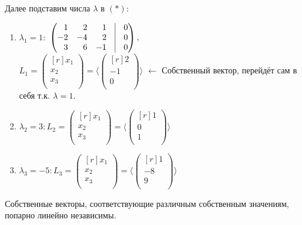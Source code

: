 Далее подставим числа $\lambda$ в $(*)$:

\begin{enumerate}
\item{
$\lambda_1=1 :$
$\begin{pmatrix*}[r]
 1 & 2 & 1 & \vrule & 0\\
 -2 & -4 & 2 & \vrule & 0\\
 3 & 6 & -1 & \vrule & 0\\
\end{pmatrix*} , $\\
$
L_1=
\left(
\begin{smallmatrix*}[r]
x_1\\ x_2\\ x_3\\ 
\end{smallmatrix*}
\right) 
=
\langle
\left(
\begin{smallmatrix*}[r]
2\\ -1\\ 0\\ 
\end{smallmatrix*}
\right) 
\rangle
$
$\leftarrow $
 Собственный вектор, перейдёт сам в себя т.к. $\lambda=1$.
}
\item{
$\lambda_2=3 :
L_2=
\left(
\begin{smallmatrix*}[r]
x_1\\ x_2\\ x_3\\ 
\end{smallmatrix*}
\right) 
=
\langle
\left(
\begin{smallmatrix*}[r]
1\\ 0\\ 1\\ 
\end{smallmatrix*}
\right) 
\rangle
$
}
\item{
$\lambda_3=-5 :
L_3=
\left(
\begin{smallmatrix*}[r]
x_1\\ x_2\\ x_3\\ 
\end{smallmatrix*}
\right) 
=
\langle
\left(
\begin{smallmatrix*}[r]
1\\ -8\\ 9\\ 
\end{smallmatrix*}
\right) 
\rangle
$
}
\end{enumerate}

\begin{lemma} %
	Собственные векторы, соответствующие различным собственным значениям, попарно линейно независимы.
\end{lemma}


